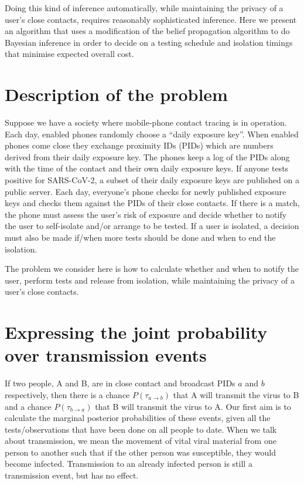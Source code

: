 \documentclass{article}
\begin{document}
Doing this kind of inference automatically, while maintaining the privacy of a user's close contacts, requires reasonably sophisticated inference. Here we present an algorithm that uses a modification of the belief propagation algorithm\cite{pearl2014probabilistic} to do Bayesian inference in order to decide on a testing schedule and isolation timings that minimise expected overall cost.

\section{Description of the problem}

Suppose we have a society where mobile-phone contact tracing is in operation. Each day, enabled phones randomly choose a ``daily exposure key''. When enabled phones come close they exchange proximity IDs (PIDs) which are numbers derived from their daily exposure key. The phones keep a log of the PIDs along with the time of the contact and their own daily exposure keys. If anyone tests positive for SARS-CoV-2, a subset of their daily exposure keys are published on a public server. Each day, everyone's phone checks for newly published exposure keys and checks them against the PIDs of their close contacts. If there is a match, the phone must assess the user's risk of exposure and decide whether to notify the user to self-isolate and/or arrange to be tested. If a user is isolated, a decision must also be made if/when more tests should be done and when to end the isolation.

The problem we consider here is how to calculate whether and when to notify the user, perform tests and release from isolation, while maintaining the privacy of a user's close contacts.


\section{Expressing the joint probability over transmission events}

If two people, A and B, are in close contact and broadcast PIDs $a$ and $b$ respectively, then there is a chance $P(\tau_{a \rightarrow b})$ that A will transmit the virus to B and a chance $P(\tau_{b \rightarrow a})$ that B will transmit the virus to A. Our first aim is to calculate the marginal posterior probabilities of these events, given all the tests/observations that have been done on all people to date. When we talk about transmission, we mean the movement of vital viral material from one person to another such that if the other person was susceptible, they would become infected. Transmission to an already infected person is still a transmission event, but has no effect.
\end{document}
